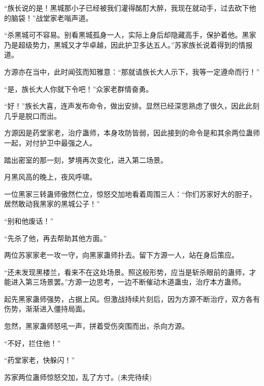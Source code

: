 \begin{this_body}
“族长说的是！黑城那小子已经被我们灌得酩酊大醉，我现在就动手，过去砍下他的脑袋！”战堂家老嗡声道。

“杀黑城可不容易。别看黑城孤身一人，实际上身后却隐藏高手，保护着他。黑家乃是超级势力，黑城又才华卓越，因此护卫多达五人。”苏家族长说着得到的情报道。

方源亦在当中，此时闻弦而知雅意：“那就请族长大人示下，我等一定遵命而行！”

“是，族长大人你就下令吧！”众家老群情奋勇。

“好！”族长大喜，连声发布命令，做出安排。显然已经深思熟虑了很久，因此此刻几乎是脱口而出。

方源因是药堂家老，治疗蛊师，本身攻防皆弱，因此接到的命令是和其余两位蛊师一起，对付护卫中最强之人。

踏出密室的那一刻，梦境再次变化，进入第二场景。

月黑风高的晚上，夜风呼啸。

一位黑家三转蛊师傲然伫立，惊怒交加地看着周围三人：“你们苏家好大的胆子，居然敢动我黑家的黑城公子！”

“别和他废话！”

“先杀了他，再去帮助其他方面。”

两位苏家家老一攻一守，向黑家蛊师扑去。留下方源一人，站在身后策应。

“还未发现黑楼兰，看来不在这处场景。照这般形势，应当是斩杀眼前的蛊师，才能进入第三场景罢。”方源一边思考，一边不断催动木道蛊虫，治疗本方蛊师。

起先黑家蛊师强势，占据上风。但激战持续片刻后，因为方源不断治疗，双方各有伤势，渐渐进入僵持局面。

忽然，黑家蛊师怒吼一声，拼着受伤突围而出，杀向方源。

“不好，拦住他！”

“药堂家老，快躲闪！”

苏家两位蛊师惊怒交加，乱了方寸。(未完待续)

\end{this_body}

